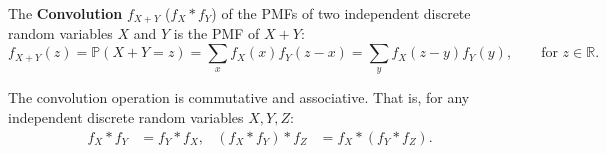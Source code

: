 \documentclass{huhtakm-template-book-v2}
\newcommand{\prob}{\mathbb{P}}
\begin{document}
    \begin{defn}
        The \textbf{Convolution} $f_{X+Y}$ ($f_{X}*f_{Y}$) of the PMFs of two independent discrete random variables $X$ and $Y$ is the PMF of $X+Y$:
        \begin{equation*}
            f_{X+Y}(z) = \prob(X+Y = z) = \sum_{x}f_{X}(x)f_{Y}(z-x) = \sum_{y}f_{X}(z-y)f_{Y}(y), \qquad\text{for }z \in \mathbb{R}.
        \end{equation*}
    \end{defn}
    \begin{rem}
        The convolution operation is commutative and associative. That is, for any independent discrete random variables $X,Y,Z$:
        \begin{align*}
            f_{X}*f_{Y} &= f_{Y}*f_{X}, & (f_{X}*f_{Y})*f_{Z} &= f_{X}*(f_{Y}*f_{Z}).
        \end{align*}
    \end{rem}
    \newpage
\end{document}
